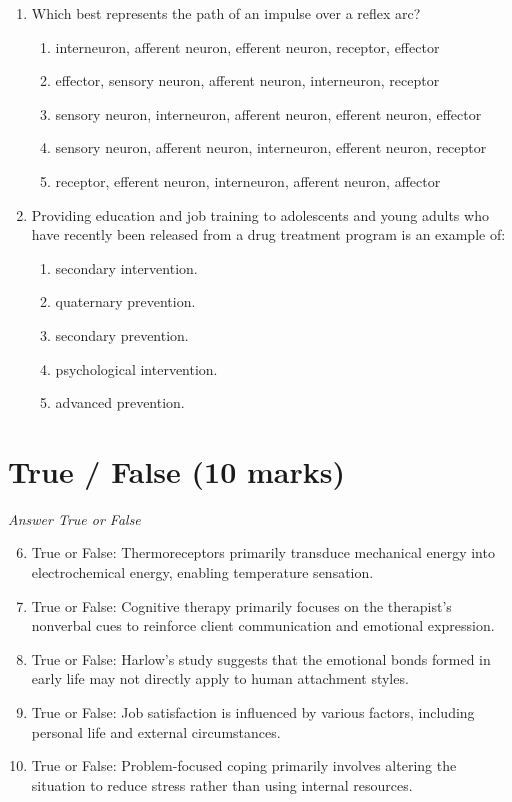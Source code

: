 \documentclass[12pt]{article}
\begin{document}
\begin{enumerate}[label=\arabic*.]
\item Which best represents the path of an impulse over a reflex arc?
\begin{enumerate}[label=(\alph*)]
    \item interneuron, afferent neuron, efferent neuron, receptor, effector
    \item effector, sensory neuron, afferent neuron, interneuron, receptor
    \item sensory neuron, interneuron, afferent neuron, efferent neuron, effector
    \item sensory neuron, afferent neuron, interneuron, efferent neuron, receptor
    \item receptor, efferent neuron, interneuron, afferent neuron, affector
\end{enumerate}
\item Providing education and job training to adolescents and young adults who have recently been released from a drug treatment program is an example of:
\begin{enumerate}[label=(\alph*)]
    \item secondary intervention.
    \item quaternary prevention.
    \item secondary prevention.
    \item psychological intervention.
    \item advanced prevention.
\end{enumerate}
\end{enumerate}

\section*{True / False (10 marks)}
\textit{Answer True or False}
\begin{enumerate}[label=\arabic*.]
\setcounter{enumi}{5}
\item True or False: Thermoreceptors primarily transduce mechanical energy into electrochemical energy, enabling temperature sensation.
\item True or False: Cognitive therapy primarily focuses on the therapist's nonverbal cues to reinforce client communication and emotional expression.
\item True or False: Harlow's study suggests that the emotional bonds formed in early life may not directly apply to human attachment styles.
\item True or False: Job satisfaction is influenced by various factors, including personal life and external circumstances.
\item True or False: Problem-focused coping primarily involves altering the situation to reduce stress rather than using internal resources.
\end{enumerate}
\end{document}
